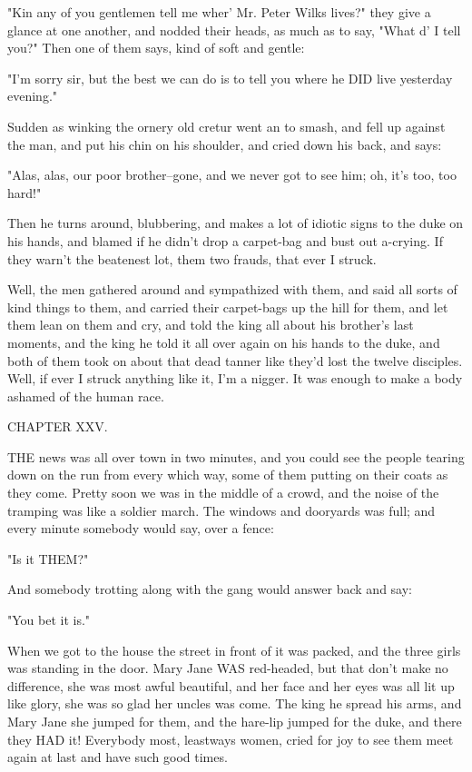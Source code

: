 "Kin any of you gentlemen tell me wher' Mr. Peter Wilks lives?" they give
a glance at one another, and nodded their heads, as much as to say, "What
d' I tell you?"  Then one of them says, kind of soft and gentle:

"I'm sorry sir, but the best we can do is to tell you where he DID live
yesterday evening."

Sudden as winking the ornery old cretur went an to smash, and fell up
against the man, and put his chin on his shoulder, and cried down his
back, and says:

"Alas, alas, our poor brother--gone, and we never got to see him; oh,
it's too, too hard!"

Then he turns around, blubbering, and makes a lot of idiotic signs to the
duke on his hands, and blamed if he didn't drop a carpet-bag and bust out
a-crying.  If they warn't the beatenest lot, them two frauds, that ever I
struck.

Well, the men gathered around and sympathized with them, and said all
sorts of kind things to them, and carried their carpet-bags up the hill
for them, and let them lean on them and cry, and told the king all about
his brother's last moments, and the king he told it all over again on his
hands to the duke, and both of them took on about that dead tanner like
they'd lost the twelve disciples.  Well, if ever I struck anything like
it, I'm a nigger. It was enough to make a body ashamed of the human race.




CHAPTER XXV.

THE news was all over town in two minutes, and you could see the people
tearing down on the run from every which way, some of them putting on
their coats as they come.  Pretty soon we was in the middle of a crowd,
and the noise of the tramping was like a soldier march.  The windows and
dooryards was full; and every minute somebody would say, over a fence:

"Is it THEM?"

And somebody trotting along with the gang would answer back and say:

"You bet it is."

When we got to the house the street in front of it was packed, and the
three girls was standing in the door.  Mary Jane WAS red-headed, but that
don't make no difference, she was most awful beautiful, and her face and
her eyes was all lit up like glory, she was so glad her uncles was come.
The king he spread his arms, and Mary Jane she jumped for them, and the
hare-lip jumped for the duke, and there they HAD it!  Everybody most,
leastways women, cried for joy to see them meet again at last and have
such good times.

